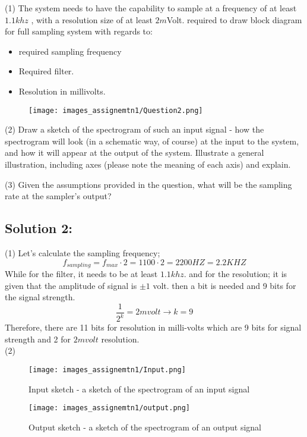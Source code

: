 \documentclass[letterpaper, 12pt]{article}
\begin{document}
(1) The system needs to have the capability to sample at a frequency of at least $1.1khz$ , with a resolution size of at least $2m$Volt.
    required to draw block diagram for full sampling system with regards to: \\
    \begin{itemize}
        \item required sampling frequency
        \item Required filter.
        \item Resolution in millivolts.
    \end{itemize}
    
\begin{figure}[htbp]
    \centering
    \texttt{[image: images\_assignemtn1/Question2.png]}
    \caption{}
    \label{fig:enter-label}
\end{figure}

(2) Draw a sketch of the spectrogram of such an input signal - how the spectrogram will look (in a schematic way, of course) at the input to the system, and how it will appear at the output of the system. Illustrate a general illustration, including axes (please note the meaning of each axis) and explain.


(3) Given the assumptions provided in the question, what will be the sampling rate at the sampler's output?

\subsection*{Solution 2:}

(1) Let's calculate the sampling frequency;
\[f_{sampling} = f_{max} \cdot 2 = 1100 \cdot 2 = 2200HZ = 2.2KHZ\]
While for the filter, it needs to be at least $1.1khz$. and for the resolution; it is given that the amplitude of signal is $\pm 1$ volt. then a bit is needed and 9 bits for the signal strength. \\
\[\frac{1}{2^k} = 2m volt \rightarrow k = 9\]
Therefore, there are 11 bits for resolution in milli-volts which are 9 bits for signal strength and 2 for $2mvolt$ resolution. \\
(2) 
\begin{figure}[h!]
    \centering
    \begin{minipage}{0.45\textwidth}
        \centering
        \texttt{[image: images\_assignemtn1/Input.png]}
        \caption{Input sketch - a sketch of the spectrogram of an input signal }
        \label{fig:input}
    \end{minipage}
    \hspace{0.5cm}
    \begin{minipage}{0.45\textwidth}
        \centering
        \texttt{[image: images\_assignemtn1/output.png]}
        \caption{Output sketch - a sketch of the spectrogram of an output signal }
        \label{fig:output}
    \end{minipage}
\end{figure}
\end{document}
